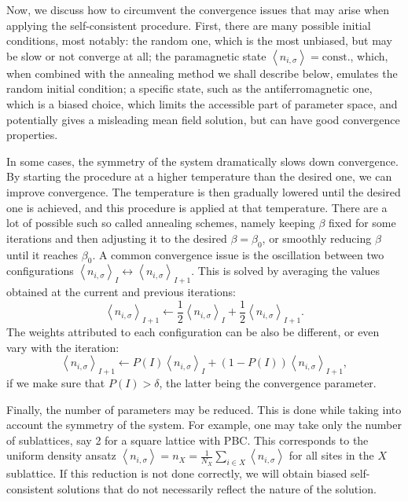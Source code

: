 Now, we discuss how to circumvent the convergence issues that may arise when applying the self-consistent procedure.
First, there are many possible initial conditions, most notably: the random one, which is the most unbiased, but may be slow or not converge at all; the paramagnetic state $\left\langle n_{i,\sigma} \right\rangle = \text{const.}$, which, when combined with the annealing method we shall describe below, emulates the random initial condition; a specific state, such as the antiferromagnetic one, which is a biased choice, which limits the accessible part of parameter space, and potentially gives a misleading mean field solution, but can have good convergence properties.

In some cases, the symmetry of the system dramatically slows down convergence.
By starting the procedure at a higher temperature than the desired one, we can improve convergence.
The temperature is then gradually lowered until the desired one is achieved, and this procedure is applied at that temperature.
There are a lot of possible such so called  annealing schemes, namely keeping $\beta$ fixed for some iterations and then adjusting it to the desired $\beta = \beta_0$, or smoothly reducing $\beta$ until it reaches $\beta_0$.
A common convergence issue is the oscillation between two configurations $\left\langle n_{i,\sigma}\right\rangle_I \leftrightarrow \left\langle n_{i,\sigma}\right\rangle_{I+1}$.
This is solved by averaging the values obtained at the current and previous iterations:
\begin{equation}
\left\langle n_{i,\sigma}\right\rangle_{I+1} \leftarrow \frac{1}{2} \left\langle n_{i,\sigma}\right\rangle_I + \frac{1}{2} \left\langle n_{i,\sigma}\right\rangle_{I+1}.
\end{equation}
The weights attributed to each configuration can be also be different, or even vary with the iteration:
\begin{equation}
\left\langle n_{i,\sigma}\right\rangle_{I+1} \leftarrow P(I) \left\langle n_{i,\sigma}\right\rangle_I + (1 - P(I) ) \left\langle n_{i,\sigma}\right\rangle_{I+1},
\end{equation}
if we make sure that $P(I) > \delta$, the latter being the convergence parameter.

Finally, the number of parameters may be reduced.
This is done while taking into account the symmetry of the system.
For example, one may take only the number of sublattices, say 2 for a square lattice with PBC.
This corresponds to the uniform density ansatz $\left\langle n_{i,\sigma} \right\rangle = n_X = \frac{1}{N_X} \sum_{i \in X} \left\langle n_{i,\sigma} \right\rangle$ for all sites in the $X$ sublattice.
If this reduction is not done correctly, we will obtain biased self-consistent solutions that do not necessarily reflect the nature of the solution.

